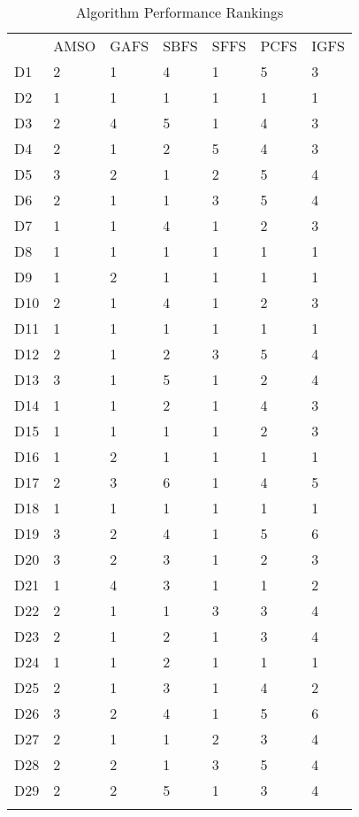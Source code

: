 \begin{table}
\caption{Algorithm Performance Rankings}
\label{tbl:algorithm:rank}
\begin{tabular}{lllllll}
\noalign{\smallskip}\hline\noalign{\smallskip}
&AMSO&GAFS&SBFS&SFFS&PCFS&IGFS\\
\noalign{\smallskip}\hline
D1&2&1&4&1&5&3\\
D2&1&1&1&1&1&1\\
D3&2&4&5&1&4&3\\
D4&2&1&2&5&4&3\\
D5&3&2&1&2&5&4\\
D6&2&1&1&3&5&4\\
D7&1&1&4&1&2&3\\
D8&1&1&1&1&1&1\\
D9&1&2&1&1&1&1\\
D10&2&1&4&1&2&3\\
D11&1&1&1&1&1&1\\
D12&2&1&2&3&5&4\\
D13&3&1&5&1&2&4\\
D14&1&1&2&1&4&3\\
D15&1&1&1&1&2&3\\
D16&1&2&1&1&1&1\\
D17&2&3&6&1&4&5\\
D18&1&1&1&1&1&1\\
D19&3&2&4&1&5&6\\
D20&3&2&3&1&2&3\\
D21&1&4&3&1&1&2\\
D22&2&1&1&3&3&4\\
D23&2&1&2&1&3&4\\
D24&1&1&2&1&1&1\\
D25&2&1&3&1&4&2\\
D26&3&2&4&1&5&6\\
D27&2&1&1&2&3&4\\
D28&2&2&1&3&5&4\\
D29&2&2&5&1&3&4\\
\noalign{\smallskip}\hline
\end{tabular}
\end{table}
